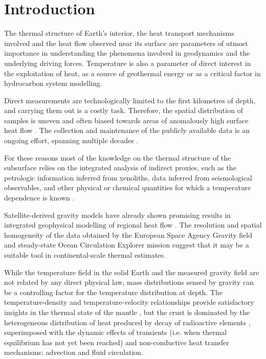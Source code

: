 \section{Introduction}
\label{s:Appl:Intro}
The thermal structure of Earth's interior, the heat transport mechanisms involved and the heat flow observed near its surface are parameters of utmost importance in understanding the phenomena involved in geodynamics and the underlying driving forces.
Temperature is also a parameter of direct interest in the exploitation of heat, as a source of geothermal energy or as a critical factor in hydrocarbon system modelling.

Direct measurements are technologically limited to the first kilometres of depth, and carrying them out is a costly task.
Therefore, the spatial distribution of samples is uneven and often biased towards areas of anomalously high surface heat flow \parencite{Mareschal2013}.
The collection and maintenance of the publicly available data is an ongoing effort, spanning multiple decades \parencite{Lee1965}.

For these reasons most of the knowledge on the thermal structure of the subsurface relies on the integrated analysis of indirect proxies, such as the petrologic information inferred from xenoliths, data inferred from seismological observables, and other physical or chemical quantities for which a temperature dependence is known \parencites{fischer2010lab}{Vila2010}{Afonso2013multiobsI}.

Satellite-derived gravity models have already shown promising results in integrated geophysical modelling of regional heat flow \parencite{Bouman2015}.
The resolution and spatial homogeneity of the data obtained by the European Space Agency Gravity field and steady-state Ocean Circulation Explorer mission \parencites[GOCE, ][]{Floberghagen2011_goce}{vanderMeijde2015} suggest that it may be a suitable tool in continental-scale thermal estimates.

While the temperature field in the solid Earth and the measured gravity field are not related by any direct physical law, mass distributions sensed by gravity can be a controlling factor for the temperature distribution at depth.
The temperature-density and temperature-velocity relationships provide satisfactory insights in the thermal state of the mantle \parencites{Priestley2006}{Cammarano2011}, but the crust is dominated by the heterogeneous distribution of heat produced by decay of radioactive elements \parencite{Jaupart2016}, superimposed with the dynamic effects of transients (i.e. when thermal equilibrium has not yet been reached) and non-conductive heat transfer mechanisms: advection and fluid circulation.

